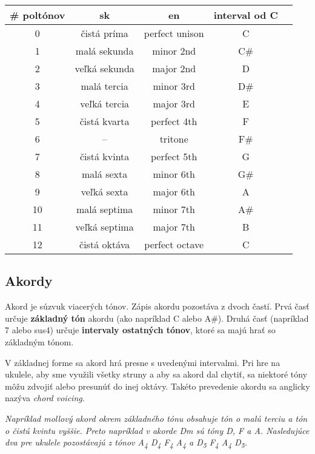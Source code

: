 \begin{center}
\begin{tabular}{ c c c c c }
    \# poltónov & sk & en & interval od C \\
    \hline
    0 & čistá príma & perfect unison & C \\
    1 & malá sekunda & minor 2nd & C\# \\
    2 & veľká sekunda & major 2nd & D \\
    3 & malá tercia & minor 3rd & D\# \\
    4 & veľká tercia & major 3rd & E \\
    5 & čistá kvarta & perfect 4th & F \\
    6 & -- & tritone & F\# \\
    7 & čistá kvinta & perfect 5th & G \\
    8 & malá sexta & minor 6th & G\# \\
    9 & veľká sexta & major 6th & A \\
    10 & malá septima & minor 7th & A\# \\
    11 & veľká septima & major 7th & B \\
    12 & čistá oktáva & perfect octave & C \\
\end{tabular}
\end{center}


\subsection*{Akordy}

Akord je súzvuk viacerých tónov. Zápis akordu pozostáva z dvoch častí. Prvá časť
určuje \textbf{základný tón} akordu (ako napríklad C alebo A\#). Druhá časť (napríklad 7 alebo sus4)
určuje \textbf{intervaly ostatných tónov}, ktoré sa majú hrať so základným tónom.

V základnej forme sa akord hrá presne s uvedenými intervalmi. Pri hre na ukulele, aby sme využili
všetky struny a aby sa akord dal chytiť, sa niektoré tóny môžu zdvojiť alebo presunúť do inej
oktávy. Takéto prevedenie akordu sa anglicky nazýva \textit{chord voicing}.

\textit{%
Napríklad mollový akord okrem základného tónu obsahuje tón o malú terciu a tón o čistú kvintu vyššie. Preto napríklad v akorde Dm sú tóny D, F a A. Nasledujúce
dva  pre ukulele pozostávajú z tónov A\textsubscript{4} D\textsubscript{4} F\textsubscript{4} A\textsubscript{4}
a D\textsubscript{5} F\textsubscript{4} A\textsubscript{4} D\textsubscript{5}.
}

